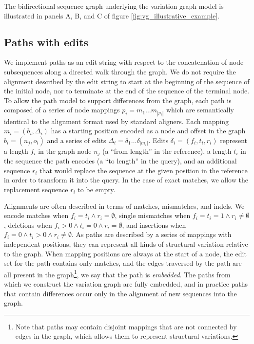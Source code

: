 The bidirectional sequence graph underlying the variation graph model is illustrated in panels A, B, and C of figure \ref{fig:vg_illustrative_example}.

\subsection{Paths with edits}
We implement paths as an edit string with respect to the concatenation of node subsequences along a directed walk through the graph.
We do not require the alignment described by the edit string to start at the beginning of the sequence of the initial node, nor to terminate at the end of the sequence of the terminal node.
To allow the path model to support differences from the graph, each path is composed of a series of node mappings $p_i = m_1 \ldots m_{|p_i|}$ which are semantically identical to the alignment format used by standard aligners.
Each mapping $m_i = ( b_i, \Delta_i )$ has a starting position encoded as a node and offset in the graph $b_i = ( n_j, o_i )$ and a series of edits $\Delta_i = \delta_1 \ldots \delta_{|m_i|}$.
Edits $\delta_i = ( f_i, t_i, r_i )$ represent a length $f_i$ in the graph node $n_j$ (a ``from length'' in the reference), a length $t_i$ in the sequence the path encodes (a ``to length'' in the query), and an additional sequence $r_i$ that would replace the sequence at the given position in the reference in order to transform it into the query.
In the case of exact matches, we allow the replacement sequence $r_i$ to be empty.

Alignments are often described in terms of matches, mismatches, and indels.
We encode matches when $f_i = t_i \land r_i = \emptyset$, single mismatches when $f_i = t_i = 1 \land r_i \neq \emptyset$, deletions when $f_i > 0 \land t_i = 0 \land r_i = \emptyset$, and insertions when $f_i = 0 \land t_i > 0 \land r_i \neq \emptyset$.
As paths are described by a series of mappings with independent positions, they can represent all kinds of structural variation relative to the graph.
When mapping positions are always at the start of a node, the edit set for the path contains only matches, and the edges traversed by the path are all present in the graph\footnote{Note that paths may contain disjoint mappings that are not connected by edges in the graph, which allows them to represent structural variations.}, we say that the path is \emph{embedded}.
The paths from which we construct the variation graph are fully embedded, and in practice paths that contain differences occur only in the alignment of new sequences into the graph.

